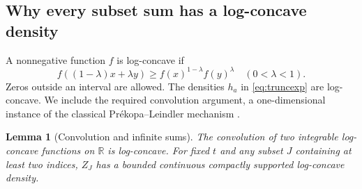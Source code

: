 \documentclass[11pt,a4paper]{article}
\numberwithin{equation}{section}
\newtheorem{lemma}[lemma]{Lemma}
\theoremstyle{definition}
\theoremstyle{remark}
\newcommand{\R}{\mathbb R}
\begin{document}
\subsection{Why every subset sum has a log-concave density}
A nonnegative function $f$ is log-concave if
\[
 f((1-\lambda)x+\lambda y)\ge f(x)^{1-\lambda}f(y)^\lambda
 \quad(0<\lambda<1).
\]
Zeros outside an interval are allowed. The densities $h_a$ in
\cref{eq:truncexp} are log-concave. We include the required
convolution argument, a one-dimensional instance of the classical
Pr\'ekopa--Leindler mechanism \cite{prekopa}.

\begin{lemma}[Convolution and infinite sums]\label{lem:logconcave}
The convolution of two integrable log-concave functions on $\R$
is log-concave. For fixed $t$ and any subset $J$ containing at
least two indices, $Z_J$ has a bounded continuous compactly
supported log-concave density.
\end{lemma}
\end{document}
